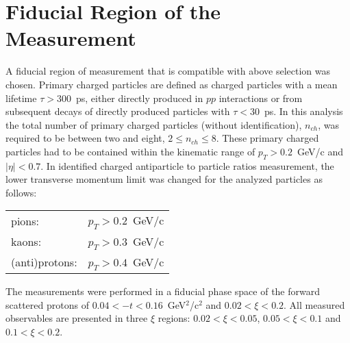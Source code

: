 \section{Fiducial Region of the Measurement}\label{section:star_fiducial}
A fiducial region of measurement that is compatible with above selection was chosen. Primary charged particles are defined as charged particles with a mean lifetime $\tau >300$~ps, either directly produced in $pp$ interactions or from subsequent decays of directly produced particles with $\tau <30$~ps. In this analysis the total number of primary charged particles (without identification), $n_{ch}$, was required to be between two and eight, $2\leq n_{ch} \leq 8$. These primary charged particles had to be contained within the kinematic range of $p_T>0.2$~GeV/c and $|\eta|<0.7$. In identified charged antiparticle to particle ratios measurement, the lower transverse momentum limit was changed for the analyzed particles as follows: 
\begin{table}[h!]
	\begin{tabular}{ll}
	pions: & $p_T>0.2$~GeV/c\\
	kaons: & $p_T>0.3$~GeV/c\\
	(anti)protons: & $p_T>0.4$~GeV/c\\
	\end{tabular}
\end{table}

The measurements were performed in a fiducial phase space of the forward scattered protons of $0.04<-t<0.16$~GeV$^{2}$/c$^2$ and $0.02 < \xi<0.2$. All measured observables are presented in three $\xi$ regions: $0.02<\xi<0.05$, $0.05<\xi<0.1$ and $0.1<\xi<0.2$.
\FloatBarrier